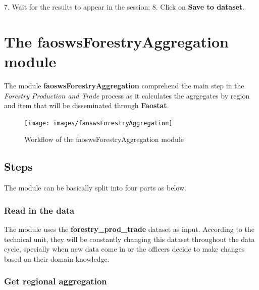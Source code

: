 \documentclass[
]{book}
\begin{document}
7. Wait for the results to appear in the session;
8. Click on \textbf{Save to dataset}.

\hypertarget{faoswsForestryAggregation}{%
\chapter{\texorpdfstring{\textbf{The faoswsForestryAggregation module}}{The faoswsForestryAggregation module}}\label{faoswsForestryAggregation}}

The module \textbf{faoswsForestryAggregation} comprehend the main step in the \emph{Forestry Production and Trade} process as it calculates the agrgegates by region and item that will be disseminated through \textbf{Faostat}.

\begin{figure}

{\centering \texttt{[image: images/faoswsForestryAggregation]} 

}

\caption{Workflow of the faoswsForestryAggregation module}\label{fig:faoswsForestryAggregationWorkflow}
\end{figure}

\hypertarget{steps-3}{%
\section{\texorpdfstring{\textbf{Steps}}{Steps}}\label{steps-3}}

The module can be basically split into four parts as below.

\hypertarget{read-in-the-data}{%
\subsection{\texorpdfstring{\textbf{Read in the data}}{Read in the data}}\label{read-in-the-data}}

The module uses the \textbf{forestry\_prod\_trade} dataset as input. According to the technical unit, they will be constantly changing this dataset throughout the data cycle, specially when new data come in or the officers decide to make changes based on their domain knowledge.

\hypertarget{get-regional-aggregation}{%
\subsection{\texorpdfstring{\textbf{Get regional aggregation}}{Get regional aggregation}}\label{get-regional-aggregation}}
\end{document}
